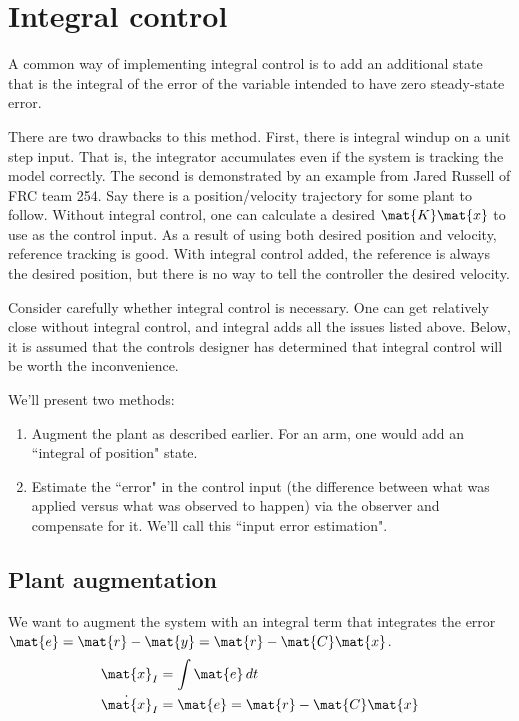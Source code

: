 \section{Integral control}
\label{sec:integral_control}

A common way of implementing integral control is to add an additional
\gls{state} that is the integral of the \gls{error} of the variable intended to
have zero \gls{steady-state error}.

There are two drawbacks to this method. First, there is integral windup on a
unit \gls{step input}. That is, the integrator accumulates even if the
\gls{system} is \gls{tracking} the \gls{model} correctly. The second is
demonstrated by an example from Jared Russell of FRC team 254. Say there is a
position/velocity trajectory for some \gls{plant} to follow. Without integral
control, one can calculate a desired $\mat{K}\mat{x}$ to use as the
\gls{control input}. As a result of using both desired position and velocity,
\gls{reference} \gls{tracking} is good. With integral control added, the
\gls{reference} is always the desired position, but there is no way to tell the
controller the desired velocity.

Consider carefully whether integral control is necessary. One can get relatively
close without integral control, and integral adds all the issues listed above.
Below, it is assumed that the controls designer has determined that integral
control will be worth the inconvenience.

We'll present two methods:
\begin{enumerate}
  \item Augment the \gls{plant} as described earlier. For an arm, one would add
    an ``integral of position" state.
  \item Estimate the ``error" in the \gls{control input} (the difference between
    what was applied versus what was observed to happen) via the \gls{observer}
    and compensate for it. We'll call this ``input error estimation".
\end{enumerate}

\subsection{Plant augmentation}

We want to augment the \gls{system} with an integral term that integrates the
\gls{error} $\mat{e} = \mat{r} - \mat{y} = \mat{r} - \mat{C}\mat{x}$.
\begin{align*}
  \mat{x}_I &= \int \mat{e} \,dt \\
  \dot{\mat{x}}_I &= \mat{e} = \mat{r} - \mat{C}\mat{x}
\end{align*}

